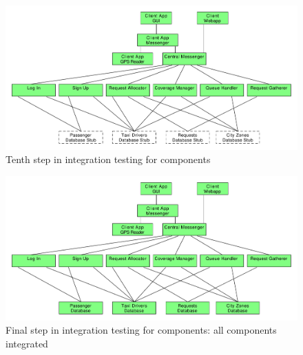 \begin{figure}
\centering
\includegraphics[width=\textwidth]{tex-images/comp-10}
\caption{Tenth step in integration testing for components}
\end{figure}

\begin{figure}
\centering
\includegraphics[width=\textwidth]{tex-images/comp-11}
\caption{Final step in integration testing for components: all components integrated}
\end{figure}
